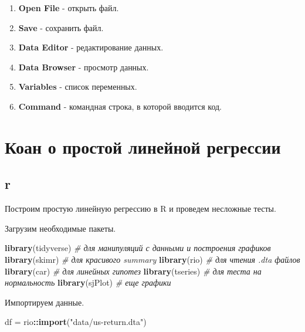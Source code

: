 \documentclass[]{book}
\newenvironment{Shaded}{\begin{snugshade}}{\end{snugshade}}
\newcommand{\CommentTok}[1]{\textcolor[rgb]{0.56,0.35,0.01}{\textit{#1}}}
\newcommand{\KeywordTok}[1]{\textcolor[rgb]{0.13,0.29,0.53}{\textbf{#1}}}
\newcommand{\NormalTok}[1]{#1}
\newcommand{\OperatorTok}[1]{\textcolor[rgb]{0.81,0.36,0.00}{\textbf{#1}}}
\newcommand{\StringTok}[1]{\textcolor[rgb]{0.31,0.60,0.02}{#1}}
\providecommand{\tightlist}{%
  \setlength{\itemsep}{0pt}\setlength{\parskip}{0pt}}
\begin{document}
\begin{enumerate}
\def\labelenumi{\arabic{enumi}.}
\tightlist
\item
  \textbf{Open File} - открыть файл.
\item
  \textbf{Save} - сохранить файл.
\item
  \textbf{Data Editor} - редактирование данных.
\item
  \textbf{Data Browser} - просмотр данных.
\item
  \textbf{Variables} - список переменных.
\item
  \textbf{Command} - командная строка, в которой вводится код.
\end{enumerate}

\hypertarget{simplereg}{%
\chapter{Коан о простой линейной регрессии}\label{simplereg}}

\hypertarget{r}{%
\section{r}\label{r}}

Построим простую линейную регрессию в R и проведем несложные тесты.

Загрузим необходимые пакеты.

\begin{Shaded}
\begin{Highlighting}[]
\KeywordTok{library}\NormalTok{(tidyverse) }\CommentTok{# для манипуляций с данными и построения графиков}
\KeywordTok{library}\NormalTok{(skimr) }\CommentTok{# для красивого summary}
\KeywordTok{library}\NormalTok{(rio) }\CommentTok{# для чтения .dta файлов}
\KeywordTok{library}\NormalTok{(car) }\CommentTok{# для линейных гипотез}
\KeywordTok{library}\NormalTok{(tseries) }\CommentTok{# для теста на нормальность}
\KeywordTok{library}\NormalTok{(sjPlot) }\CommentTok{# еще графики}
\end{Highlighting}
\end{Shaded}

Импортируем данные.

\begin{Shaded}
\begin{Highlighting}[]
\NormalTok{df =}\StringTok{ }\NormalTok{rio}\OperatorTok{::}\KeywordTok{import}\NormalTok{(}\StringTok{"data/us-return.dta"}\NormalTok{)}
\end{Highlighting}
\end{Shaded}
\end{document}
